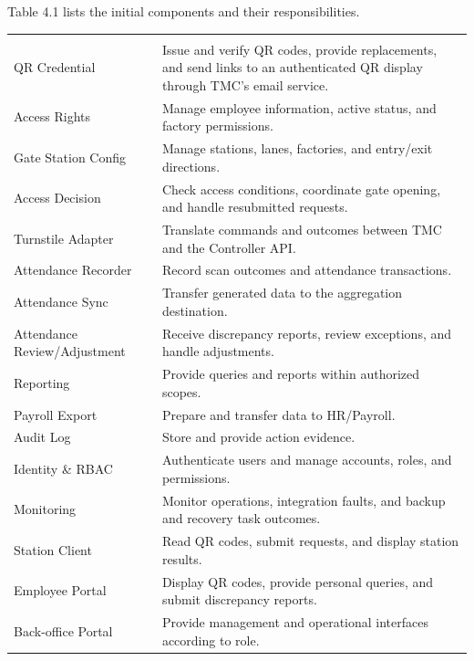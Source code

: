 Table 4.1 lists the initial components and their responsibilities.

\begin{longtable}{|>{\raggedright\arraybackslash}p{128.5pt}|>{\raggedright\arraybackslash}p{294.5pt}|}
\hline
\multicolumn{1}{|>{\columncolor{tableheader}\centering\arraybackslash}p{128.5pt}|}{\textbf{Component}} & \multicolumn{1}{>{\columncolor{tableheader}\centering\arraybackslash}p{294.5pt}|}{\textbf{Responsibility}} \\
\hline
\endhead
\multicolumn{2}{c}{\rule{0pt}{20pt}\normalsize\textbf{Table 4.1. Initial Components and Responsibilities}} \\
\endlastfoot
QR Credential & Issue and verify QR codes, provide replacements, and send links to an authenticated QR display through TMC's email service. \\
\hline
Access Rights & Manage employee information, active status, and factory permissions. \\
\hline
Gate Station Config & Manage stations, lanes, factories, and entry/exit directions. \\
\hline
Access Decision & Check access conditions, coordinate gate opening, and handle resubmitted requests. \\
\hline
Turnstile Adapter & Translate commands and outcomes between TMC and the Controller API. \\
\hline
Attendance Recorder & Record scan outcomes and attendance transactions. \\
\hline
Attendance Sync & Transfer generated data to the aggregation destination. \\
\hline
Attendance Review/Adjustment & Receive discrepancy reports, review exceptions, and handle adjustments. \\
\hline
Reporting & Provide queries and reports within authorized scopes. \\
\hline
Payroll Export & Prepare and transfer data to HR/Payroll. \\
\hline
Audit Log & Store and provide action evidence. \\
\hline
Identity \& RBAC & Authenticate users and manage accounts, roles, and permissions. \\
\hline
Monitoring & Monitor operations, integration faults, and backup and recovery task outcomes. \\
\hline
Station Client & Read QR codes, submit requests, and display station results. \\
\hline
Employee Portal & Display QR codes, provide personal queries, and submit discrepancy reports. \\*
\hline\noalign{\nobreak}
Back-office Portal & Provide management and operational interfaces according to role. \\
\hline
\end{longtable}


